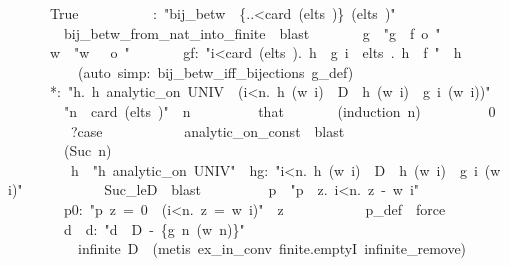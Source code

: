 \documentclass[runningheads]{llncs}
\begin{document}
\begin{isabelle}
\ \ \ \ \ \ \ True\isanewline
\ \ \ \ \ \ \ \ \isasymeta \ \ \isasymeta :\ "bij\_betw\ \isasymeta \ \{..<card\ (elts\ \isasymgamma )\}\ (elts\ \isasymgamma )"\isanewline
\ \ \ \ \ \ \ \ \ bij\_betw\_from\_nat\_into\_finite\ \ blast\isanewline
\ \ \ \ \ \ \ g\ \ "g\ \isasymequiv \ f\ o\ \isasymeta "\isanewline
\ \ \ \ \ \ \ w\ \ "w\ \isasymequiv \ \isasymzeta \ o\ \isasymeta "\isanewline
\ \ \ \ \ \ \ gf:\ "\isasymforall i<card\ (elts\ \isasymgamma ).\ h\ \isasymnoteq \ g\ i\ \isasymLongrightarrow \ \isasymforall \isasymbeta \isasymin elts\ \isasymgamma .\ h\ \isasymnoteq \ f\ \isasymbeta "\ \ h\isanewline
\ \ \ \ \ \ \ \ \ \isasymeta \ \ (auto\ simp:\ bij\_betw\_iff\_bijections\ g\_def)\isanewline
\ \ \ \ \ \ \ *:\ "\isasymexists h.\ h\ analytic\_on\ UNIV\ \isasymand \ (\isasymforall i<n.\ h\ (w\ i)\ \isasymin \ D\ \isasymand \ h\ (w\ i)\ \isasymnoteq \ g\ i\ (w\ i))"\isanewline
\ \ \ \ \ \ \ \ \ "n\ \isasymle \ card\ (elts\ \isasymgamma )"\ \ n\isanewline
\ \ \ \ \ \ \ \ \ that\isanewline
\ \ \ \ \ \ \ (induction\ n)\isanewline
\ \ \ \ \ \ \ \ \ 0\isanewline
\ \ \ \ \ \ \ \ \ \ ?case\isanewline
\ \ \ \ \ \ \ \ \ \ \ analytic\_on\_const\ \ blast\isanewline
\ \ \ \ \ \ \isanewline
\ \ \ \ \ \ \ \ \ (Suc\ n)\isanewline
\ \ \ \ \ \ \ \ \ \ h\ \ "h\ analytic\_on\ UNIV"\ \ hg:\ "\isasymforall i<n.\ h\ (w\ i)\ \isasymin \ D\ \isasymand \ h\ (w\ i)\ \isasymnoteq \ g\ i\ (w\ i)"\isanewline
\ \ \ \ \ \ \ \ \ \ \ Suc\_leD\ \ blast\isanewline
\ \ \ \ \ \ \ \ \ p\ \ "p\ \isasymequiv \ \isasymlambda z.\ \isasymProd i<n.\ z\ -\ w\ i"\isanewline
\ \ \ \ \ \ \ \ \ p0:\ "p\ z\ =\ 0\ \isasymlongleftrightarrow \ (\isasymexists i<n.\ z\ =\ w\ i)"\ \ z\isanewline
\ \ \ \ \ \ \ \ \ \ \ p\_def\ \ force\isanewline
\ \ \ \ \ \ \ \ \ d\ \ d:\ "d\ \isasymin \ D\ -\ \{g\ n\ (w\ n)\}"\isanewline
\ \ \ \ \ \ \ \ \ \ \ \isacartoucheopen infinite\ D\isacartoucheclose \ \ (metis\ ex\_in\_conv\ finite.emptyI\ infinite\_remove)\isanewline

\end{isabelle}
\end{document}
